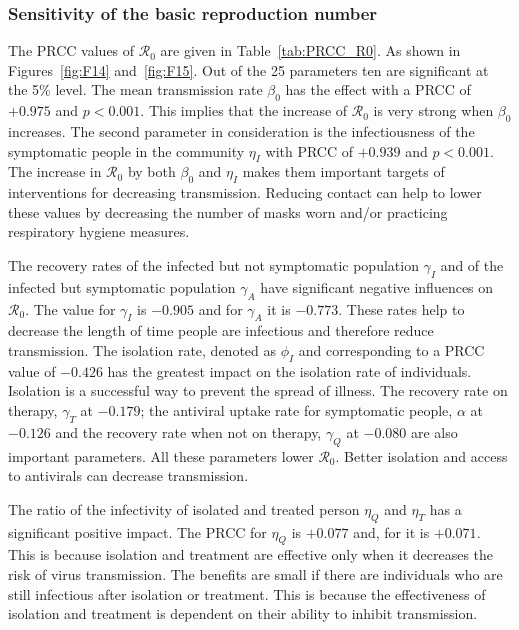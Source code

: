 \documentclass[12pt,a4paper]{article}
\theoremstyle{definition}
\theoremstyle{remark}
\begin{document}
\subsubsection{Sensitivity of the basic reproduction number}

The PRCC values of $\mathcal{R}_0$ are given in Table~\ref{tab:PRCC_R0}. As shown in Figures~\ref{fig:F14} and~\ref{fig:F15}. Out of the 25 parameters ten are significant at the 5\% level. The mean transmission rate $\beta_0$ has the effect with a PRCC of $+0.975$ and $p < 0.001$. This implies that the increase of $\mathcal{R}_0$ is very strong when $\beta_0$ increases. The second parameter in consideration is the infectiousness of the symptomatic people in the community $\eta_I$ with PRCC of $+0.939$ and $p < 0.001$. The increase in $\mathcal{R}_0$ by both $\beta_0$ and $\eta_I$ makes them important targets of interventions for decreasing transmission. Reducing contact can help to lower these values by decreasing the number of masks worn and/or practicing respiratory hygiene measures.

The recovery rates of the infected but not symptomatic population $\gamma_I$ and of the infected but symptomatic population $\gamma_A$ have significant negative influences on $\mathcal{R}_0$. The value for $\gamma_I$ is $-0.905$ and for $\gamma_A$ it is $-0.773$. These rates help to decrease the length of time people are infectious and therefore reduce transmission. The isolation rate, denoted as $\phi_I$ and corresponding to a PRCC value of $-0.426$ has the greatest impact on the isolation rate of individuals. Isolation is a successful way to prevent the spread of illness. The recovery rate on therapy, $\gamma_T$ at $-0.179$; the antiviral uptake rate for symptomatic people, $\alpha$ at $-0.126$ and the recovery rate when not on therapy, $\gamma_Q$ at $-0.080$ are also important parameters. All these parameters lower $\mathcal{R}_0$. Better isolation and access to antivirals can decrease transmission.

The ratio of the infectivity of isolated and treated person $\eta_Q$ and $\eta_T$ has a significant positive impact. The PRCC for $\eta_Q$ is $+0.077$ and, for it is $+0.071$. This is because isolation and treatment are effective only when it decreases the risk of virus transmission. The benefits are small if there are individuals who are still infectious after isolation or treatment. This is because the effectiveness of isolation and treatment is dependent on their ability to inhibit transmission.
\end{document}
